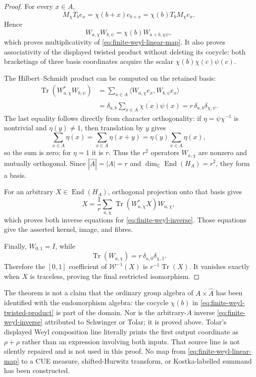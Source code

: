 \begin{proof}
For every $x\in A$,
\[
 M_\chi T_b e_x
 =\chi(b+x)e_{b+x}
 =\chi(b)T_bM_\chi e_x.
\]
Hence
\begin{equation}
 W_{a,\chi}W_{b,\psi}
 =\chi(b)W_{a+b,\chi\psi},
 \label{eq:finite-weyl-multiplication}
\end{equation}
which proves multiplicativity of \eqref{eq:finite-weyl-linear-map}.  It also proves
associativity of the displayed twisted product without deleting its cocycle: both bracketings
of three basis coordinates acquire the scalar
$\chi(b)\chi(c)\psi(c)$.

The Hilbert--Schmidt product can be computed on the retained basis:
\begin{align}
 \operatorname{Tr}(W_{a,\chi}^*W_{b,\psi})
 &=\sum_{x\in A}
   \langle W_{a,\chi}e_x,W_{b,\psi}e_x\rangle\\
 &=\delta_{a,b}\sum_{x\in A}\overline{\chi(x)}\psi(x)
 =r\,\delta_{a,b}\delta_{\chi,\psi}.
 \label{eq:finite-weyl-orthogonality}
\end{align}
The last equality follows directly from character orthogonality: if
$\eta=\psi\chi^{-1}$ is nontrivial and $\eta(y)\ne1$, then translation by $y$ gives
\[
 \sum_{x\in A}\eta(x)
 =\sum_{x\in A}\eta(x+y)
 =\eta(y)\sum_{x\in A}\eta(x),
\]
so the sum is zero; for $\eta=1$ it is $r$.  Thus the $r^2$ operators
$W_{a,\chi}$ are nonzero and mutually orthogonal.  Since
$|\widehat A|=|A|=r$ and
$\dim_{\mathbb C}\operatorname{End}(H_A)=r^2$, they form a basis.

For an arbitrary $X\in\operatorname{End}(H_A)$, orthogonal projection onto that basis gives
\[
 X=\frac1r\sum_{a,\chi}
 \operatorname{Tr}(W_{a,\chi}^*X)W_{a,\chi},
\]
which proves both inverse equations for \eqref{eq:finite-weyl-inverse}.  Those equations give
the asserted kernel, image, and fibres.

Finally, $W_{0,1}=I$, while
\[
 \operatorname{Tr}(W_{a,\chi})
 =r\,\delta_{a,0}\delta_{\chi,1}.
\]
Therefore the $[0,1]$ coefficient of $\mathcal W^{-1}(X)$ is
$r^{-1}\operatorname{Tr}(X)$.  It vanishes exactly when $X$ is traceless, proving the final
restricted isomorphism.
\end{proof}

The theorem is not a claim that the ordinary group algebra of
$A\times\widehat A$ has been identified with the endomorphism algebra: the cocycle
$\chi(b)$ in \eqref{eq:finite-weyl-twisted-product} is part of the domain.  Nor is the
arbitrary-$A$ inverse \eqref{eq:finite-weyl-inverse} attributed to Schwinger or Tolar; it is
proved above.  Tolar's displayed Weyl composition line literally prints the first output
coordinate as $\rho+\rho$ rather than an expression involving both inputs.  That source line
is not silently repaired and is not used in this proof.  No map from
\eqref{eq:finite-weyl-linear-map} to a CUE measure, shifted-Hurwitz transform, or
Kostka-labelled summand has been constructed.

